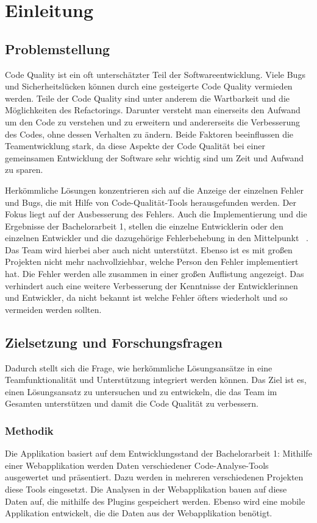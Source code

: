 \chapter{Einleitung}

\section{Problemstellung}
Code Quality ist ein oft unterschätzter Teil der Softwareentwicklung. 
Viele Bugs und Sicherheitslücken können durch eine gesteigerte Code Quality vermieden werden. Teile der Code Quality sind unter anderem die Wartbarkeit und die Möglichkeiten des Refactorings. Darunter versteht man einerseits den Aufwand um den Code zu verstehen und zu erweitern und andererseits die Verbesserung des Codes, ohne dessen Verhalten zu ändern.
Beide Faktoren beeinflussen die Teamentwicklung stark, da diese Aspekte der Code Qualität bei einer gemeinsamen Entwicklung der Software sehr wichtig sind um Zeit und Aufwand zu sparen.

Herkömmliche Lösungen konzentrieren sich auf die Anzeige der einzelnen Fehler und Bugs, die mit Hilfe von Code-Qualität-Tools herausgefunden werden. Der Fokus liegt auf der Ausbesserung des Fehlers. Auch die Implementierung und die Ergebnisse der Bachelorarbeit 1, stellen die einzelne Entwicklerin oder den einzelnen Entwickler und die dazugehörige Fehlerbehebung in den Mittelpunkt ~\parencite{wechtitschCodeQuality}. Das Team wird hierbei aber auch nicht unterstützt.
Ebenso ist es mit großen Projekten nicht mehr nachvollziehbar, welche Person den Fehler implementiert hat. Die Fehler werden alle zusammen in einer großen Auflistung angezeigt. Das verhindert auch eine weitere Verbesserung der Kenntnisse der Entwicklerinnen und Entwickler, da nicht bekannt ist welche Fehler öfters wiederholt und so vermeiden werden sollten. 

\section{Zielsetzung und Forschungsfragen}

Dadurch stellt sich die Frage, wie herkömmliche Lösungsansätze in eine Teamfunktionalität und Unterstützung integriert werden können. Das Ziel ist es, einen Lösungsansatz zu untersuchen und zu entwickeln, die das Team im Gesamten unterstützen und damit die Code Qualität zu verbessern.  

\subsection{Methodik} 
Die Applikation basiert auf dem Entwicklungsstand der Bachelorarbeit 1:
Mithilfe einer Webapplikation werden Daten verschiedener Code-Analyse-Tools ausgewertet und präsentiert. Dazu werden in mehreren verschiedenen Projekten diese Tools eingesetzt. Die Analysen in der Webapplikation bauen auf diese Daten auf, die mithilfe des Plugins gespeichert werden. 
Ebenso wird eine mobile Applikation entwickelt, die die Daten aus der Webapplikation benötigt. 


